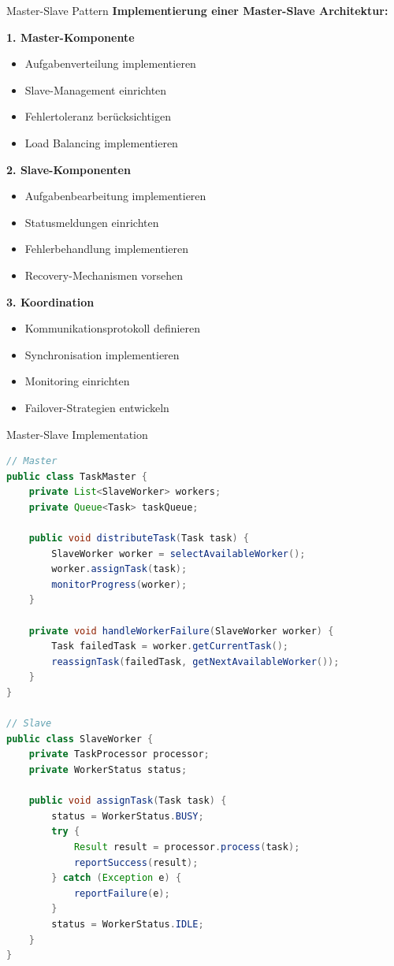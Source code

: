 \begin{KR}{Master-Slave Pattern}
\textbf{Implementierung einer Master-Slave Architektur:}

\textbf{1. Master-Komponente}
\begin{itemize}
    \item Aufgabenverteilung implementieren
    \item Slave-Management einrichten
    \item Fehlertoleranz berücksichtigen
    \item Load Balancing implementieren
\end{itemize}

\textbf{2. Slave-Komponenten}
\begin{itemize}
    \item Aufgabenbearbeitung implementieren
    \item Statusmeldungen einrichten
    \item Fehlerbehandlung implementieren
    \item Recovery-Mechanismen vorsehen
\end{itemize}

\textbf{3. Koordination}
\begin{itemize}
    \item Kommunikationsprotokoll definieren
    \item Synchronisation implementieren
    \item Monitoring einrichten
    \item Failover-Strategien entwickeln
\end{itemize}
\end{KR}

\begin{example2}{Master-Slave Implementation}
\begin{lstlisting}[language=Java, style=basesmol]
// Master
public class TaskMaster {
    private List<SlaveWorker> workers;
    private Queue<Task> taskQueue;
    
    public void distributeTask(Task task) {
        SlaveWorker worker = selectAvailableWorker();
        worker.assignTask(task);
        monitorProgress(worker);
    }
    
    private void handleWorkerFailure(SlaveWorker worker) {
        Task failedTask = worker.getCurrentTask();
        reassignTask(failedTask, getNextAvailableWorker());
    }
}

// Slave
public class SlaveWorker {
    private TaskProcessor processor;
    private WorkerStatus status;
    
    public void assignTask(Task task) {
        status = WorkerStatus.BUSY;
        try {
            Result result = processor.process(task);
            reportSuccess(result);
        } catch (Exception e) {
            reportFailure(e);
        }
        status = WorkerStatus.IDLE;
    }
}
\end{lstlisting}
\end{example2}

